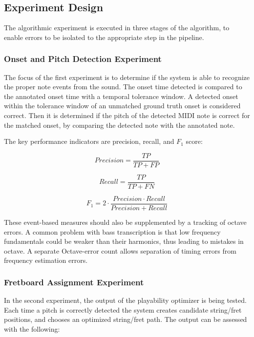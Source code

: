 \documentclass[a4paper, 12pt, titlepage]{article}
\begin{document}
\subsection{Experiment Design}

The algorithmic experiment is executed in three stages of the algorithm, to enable errors to be isolated to the appropriate step in the pipeline.

\subsubsection{Onset and Pitch Detection Experiment}

The focus of the first experiment is to determine if the system is able to recognize the proper note events from the sound. The onset time detected is compared to the annotated onset time with a temporal tolerance window. A detected onset within the tolerance window of an unmatched ground truth onset is considered correct. Then it is determined if the pitch of the detected MIDI note is correct for the matched onset, by comparing the detected note with the annotated note.

The key performance indicators are precision, recall, and $F_1$ score:

\begin{equation}
Precision = \frac{TP}{TP + FP}
\end{equation}

\begin{equation}
Recall = \frac{TP}{TP + FN}
\end{equation}

\begin{equation}
F_1 = 2 \cdot \frac{Precision \cdot Recall}{Precision + Recall}
\end{equation}

These event-based measures should also be supplemented by a tracking of octave errors. A common problem with bass transcription is that low frequency fundamentals could be weaker than their harmonics, thus leading to mistakes in octave. A separate Octave-error count allows separation of timing errors from frequency estimation errors.

\subsubsection{Fretboard Assignment Experiment}

In the second experiment, the output of the playability optimizer is being tested. Each time a pitch is correctly detected the system creates candidate string/fret positions, and chooses an optimized string/fret path. The output can be assessed with the following:
\end{document}
